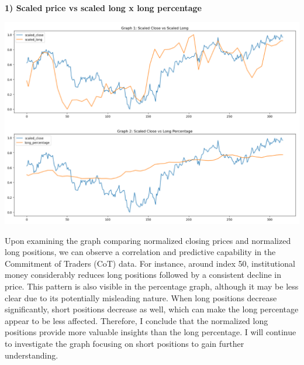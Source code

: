 \documentclass{article}
\begin{document}
\textbf{1) Scaled price vs scaled long x long percentage}
\begin{center}
    \includegraphics[scale=0.7]{p8.png}    
\end{center}

Upon examining the graph comparing normalized closing prices and normalized long positions, we can observe a correlation and predictive capability in the Commitment of Traders (CoT) data. For instance, around index 50, institutional money considerably reduces long positions followed by a consistent decline in price. This pattern is also visible in the percentage graph, although it may be less clear due to its potentially misleading nature. When long positions decrease significantly, short positions decrease as well, which can make the long percentage appear to be less affected. Therefore, I conclude that the normalized long positions provide more valuable insights than the long percentage. I will continue to investigate the graph focusing on short positions to gain further understanding. \\
\end{document}
